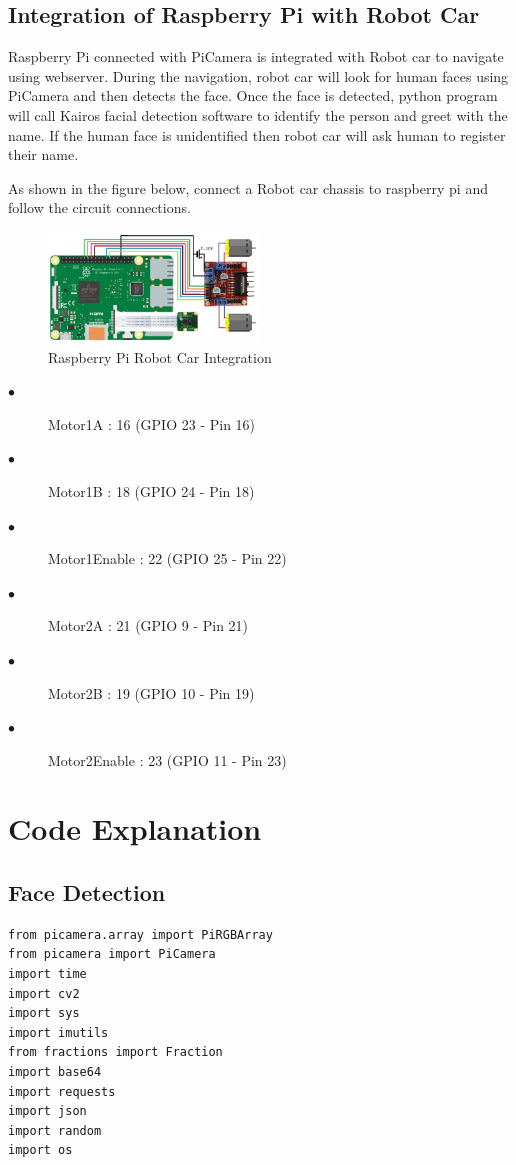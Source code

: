 \documentclass[sigconf]{acmart}
\begin{document}
\subsection{Integration of Raspberry Pi with Robot Car}
Raspberry Pi connected with PiCamera is integrated with Robot car to navigate using webserver. During the navigation, robot car will look for human faces using PiCamera and then detects the face. Once the face is detected, python program will call Kairos facial detection software to identify the person and greet with the name. If the human face is unidentified then robot car will ask human to register their name.

As shown in the figure below, connect a Robot car chassis to raspberry pi and follow the circuit connections.

\begin{figure}[ht!]
  \includegraphics[width=0.5\textwidth]{project/images/RaspPi_Robot.jpg}
  \caption{Raspberry Pi Robot Car Integration}
\end{figure}

\begin{description}
    \item[$\bullet$] Motor1A : 16 (GPIO 23 - Pin 16)
    \item[$\bullet$] Motor1B : 18 (GPIO 24 - Pin 18)
    \item[$\bullet$] Motor1Enable : 22 (GPIO 25 - Pin 22)
    \item[$\bullet$] Motor2A : 21 (GPIO 9 - Pin 21)
    \item[$\bullet$] Motor2B : 19 (GPIO 10 - Pin 19)
    \item[$\bullet$] Motor2Enable : 23 (GPIO 11 - Pin 23)
\end{description}

\section{Code Explanation}
\subsection{Face Detection}
\begin{lstlisting}
from picamera.array import PiRGBArray
from picamera import PiCamera
import time
import cv2
import sys
import imutils
from fractions import Fraction
import base64
import requests
import json
import random
import os
\end{lstlisting}
\end{document}
